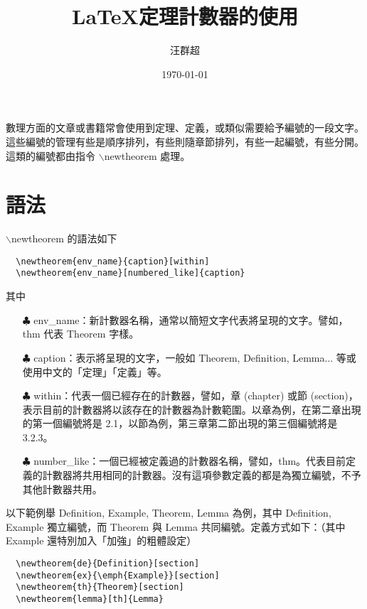 \documentclass[12pt, a4paper]{article}
\title{ \LaTeX {\MB 定理計數器的使用}}
\author{{\MB 汪群超}}
\date{{\TT \today}}
\begin{document}
\maketitle
\fontsize{12}{22pt}\selectfont

數理方面的文章或書籍常會使用到定理、定義，或類似需要給予編號的一段文字。這些編號的管理有些是順序排列，有些則隨章節排列，有些一起編號，有些分開。這類的編號都由指令 {\A $\backslash$newtheorem} 處理。  

\section{{\MB 語法}}
{\A $\backslash$newtheorem} 的語法如下
\bigskip
	\begin{lstlisting}
  \newtheorem{env_name}{caption}[within]
  \newtheorem{env_name}[numbered_like]{caption}
	\end{lstlisting}
\bigskip
其中
\begin{itemize}
\item[$\clubsuit$] env\_name：新計數器名稱，通常以簡短文字代表將呈現的文字。譬如， thm 代表 Theorem 字樣。
\item[$\clubsuit$] caption：表示將呈現的文字，一般如 Theorem, Definition, Lemma... 等或使用中文的「定理」「定義」等。
\item[$\clubsuit$] within：代表一個已經存在的計數器，譬如，章 (chapter) 或節 (section)，表示目前的計數器將以該存在的計數器為計數範圍。以章為例，在第二章出現的第一個編號將是 2.1，以節為例，第三章第二節出現的第三個編號將是 3.2.3。
\item[$\clubsuit$] number\_like：一個已經被定義過的計數器名稱，譬如，thm。代表目前定義的計數器將共用相同的計數器。沒有這項參數定義的都是為獨立編號，不予其他計數器共用。
\end{itemize}
以下範例舉 Definition, Example, Theorem, Lemma 為例，其中 Definition, Example 獨立編號，而 Theorem 與 Lemma 共同編號。定義方式如下：（其中 Example 還特別加入「加強」的粗體設定）
\bigskip
	\begin{lstlisting}
  \newtheorem{de}{Definition}[section]
  \newtheorem{ex}{\emph{Example}}[section]
  \newtheorem{th}{Theorem}[section]
  \newtheorem{lemma}[th]{Lemma}
	\end{lstlisting}
\end{document}
